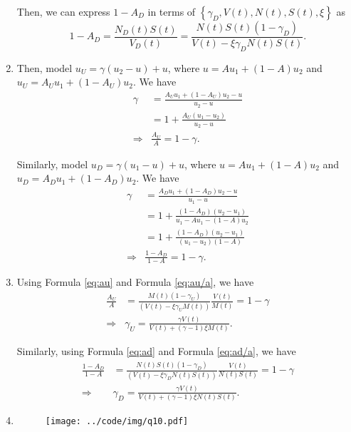\documentclass[runningheads]{llncs}
\begin{document}
\begin{enumerate}
Then, we can express $1-A_D$ in terms of $\left\{\gamma_D, V(t), N(t), S(t), \xi\right\}$ as
\begin{equation}\label{eq:ad}
    1-A_D=\frac{N_D(t)S(t)}{V_D(t)}=\frac{N(t)S(t)\left( 1-\gamma_D \right) }{V(t)-\xi\gamma_D N(t) S(t)}.
\end{equation}

\item Then, model $u_U=\gamma(u_2-u)+u$, where $u = Au_1 + (1-A)u_2$ and $u_U = A_U u_1 + (1-A_U)u_2$. We have
\begin{align}
    \gamma&=\frac{A_U u_1+(1-A_U)u_2-u}{u_2-u}\\
    &=1+\frac{A_U(u_1-u_2)}{u_2-u}\\
    \Rightarrow& \frac{A_U}{A}=1-\gamma.\label{eq:au/a}
\end{align}

Similarly, model $u_D=\gamma(u_1-u)+u$, where $u = Au_1 + (1-A)u_2$ and $u_D = A_D u_1 + (1-A_D)u_2$. We have
\begin{align}
    \gamma&=\frac{A_D u_1+(1-A_D)u_2-u}{u_1-u}\\
    &=1+\frac{(1-A_D)(u_2-u_1)}{u_1-Au_1 - (1-A)u_2}\\
    &=1+\frac{(1-A_D)(u_2-u_1)}{(u_1-u_2)(1-A)}\\
    \Rightarrow& \frac{1-A_D}{1-A}=1-\gamma.\label{eq:ad/a}
\end{align}

\item Using Formula \ref{eq:au} and Formula \ref{eq:au/a}, we have
\begin{align}
    \frac{A_U}{A}&=\frac{M(t)(1-\gamma_U)}{\left( V(t)-\xi\gamma_U M(t) \right)} \frac{V(t)}{M(t)}=1-\gamma\\
    \Rightarrow & \gamma_U=\frac{\gamma V(t)}{V(t)+(\gamma-1)\xi M(t)}.
\end{align}

Similarly, using Formula \ref{eq:ad} and Formula \ref{eq:ad/a}, we have
\begin{align}
    \frac{1-A_D}{1-A}&=\frac{N(t)S(t)(1-\gamma_D)}{\left( V(t)-\xi\gamma_D N(t)S(t) \right)} \frac{V(t)}{N(t)S(t)}=1-\gamma\\
    \Rightarrow & \gamma_D=\frac{\gamma V(t)}{V(t)+(\gamma-1)\xi N(t)S(t)}.
\end{align}

\item 
\begin{figure}[!htbp]
    \begin{center}
        \texttt{[image: ../code/img/q10.pdf]}
    \end{center}
    \caption{}
    \label{fig:q10}
\end{figure}
\end{enumerate}
\end{document}
